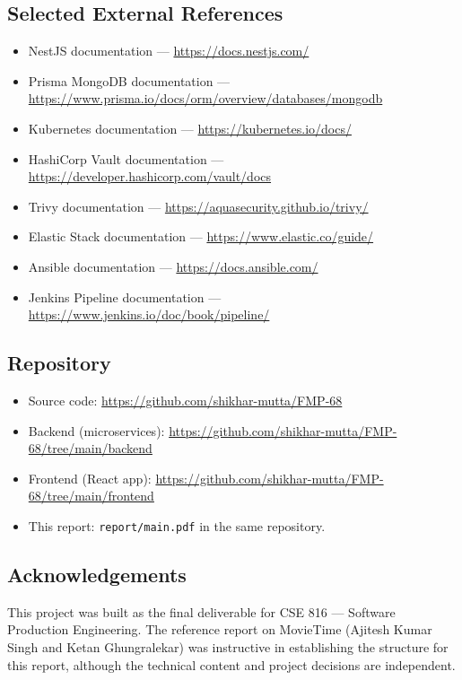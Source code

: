 \documentclass[11pt,a4paper]{article}
\begin{document}
\subsection{Selected External References}
\begin{itemize}[leftmargin=*]
  \item NestJS documentation — \url{https://docs.nestjs.com/}
  \item Prisma MongoDB documentation —
        \url{https://www.prisma.io/docs/orm/overview/databases/mongodb}
  \item Kubernetes documentation —
        \url{https://kubernetes.io/docs/}
  \item HashiCorp Vault documentation —
        \url{https://developer.hashicorp.com/vault/docs}
  \item Trivy documentation — \url{https://aquasecurity.github.io/trivy/}
  \item Elastic Stack documentation —
        \url{https://www.elastic.co/guide/}
  \item Ansible documentation — \url{https://docs.ansible.com/}
  \item Jenkins Pipeline documentation —
        \url{https://www.jenkins.io/doc/book/pipeline/}
\end{itemize}

\subsection{Repository}
\begin{itemize}[leftmargin=*]
  \item Source code: \url{https://github.com/shikhar-mutta/FMP-68}
  \item Backend (microservices):
        \url{https://github.com/shikhar-mutta/FMP-68/tree/main/backend}
  \item Frontend (React app):
        \url{https://github.com/shikhar-mutta/FMP-68/tree/main/frontend}
  \item This report: \texttt{report/main.pdf} in the same repository.
\end{itemize}

\subsection{Acknowledgements}
This project was built as the final deliverable for CSE 816 — Software
Production Engineering.  The reference report on MovieTime (Ajitesh
Kumar Singh and Ketan Ghungralekar) was instructive in establishing
the structure for this report, although the technical content and
project decisions are independent.
\end{document}
